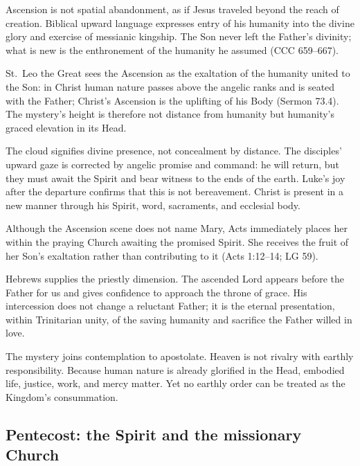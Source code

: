 Ascension is not spatial abandonment, as if Jesus traveled beyond the reach of creation. Biblical upward language expresses entry of his humanity into the divine glory and exercise of messianic kingship. The Son never left the Father's divinity; what is new is the enthronement of the humanity he assumed (CCC 659--667).

St.~Leo the Great sees the Ascension as the exaltation of the humanity united to the Son: in Christ human nature passes above the angelic ranks and is seated with the Father; Christ's Ascension is the uplifting of his Body (Sermon 73.4). The mystery's height is therefore not distance from humanity but humanity's graced elevation in its Head.

The cloud signifies divine presence, not concealment by distance. The disciples' upward gaze is corrected by angelic promise and command: he will return, but they must await the Spirit and bear witness to the ends of the earth. Luke's joy after the departure confirms that this is not bereavement. Christ is present in a new manner through his Spirit, word, sacraments, and ecclesial body.

Although the Ascension scene does not name Mary, Acts immediately places her within the praying Church awaiting the promised Spirit. She receives the fruit of her Son's exaltation rather than contributing to it (Acts 1:12--14; LG 59).

Hebrews supplies the priestly dimension. The ascended Lord appears before the Father for us and gives confidence to approach the throne of grace. His intercession does not change a reluctant Father; it is the eternal presentation, within Trinitarian unity, of the saving humanity and sacrifice the Father willed in love.

The mystery joins contemplation to apostolate. Heaven is not rivalry with earthly responsibility. Because human nature is already glorified in the Head, embodied life, justice, work, and mercy matter. Yet no earthly order can be treated as the Kingdom's consummation.

\subsection{Pentecost: the Spirit and the missionary Church}


